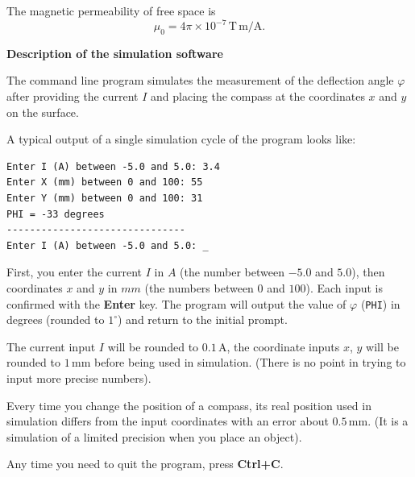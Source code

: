 The magnetic permeability of free space is
\[
\mu_0 = 4\pi \times 10^{-7}\,\mathrm{T\,m/A}.
\]

\textbf{Description of the simulation software}

The command line program simulates the measurement of the deflection angle
$\varphi$ after providing the current $I$ and placing the compass at the
coordinates $x$ and $y$ on the surface.

A typical output of a single simulation cycle of the program looks like:
\begin{verbatim}
Enter I (A) between -5.0 and 5.0: 3.4
Enter X (mm) between 0 and 100: 55
Enter Y (mm) between 0 and 100: 31
PHI = -33 degrees
-------------------------------
Enter I (A) between -5.0 and 5.0: _
\end{verbatim}

First, you enter the current $I$ in $A$ (the number between $-5.0$ and $5.0$),
then coordinates $x$ and $y$ in $mm$ (the numbers between $0$ and $100$). Each
input is confirmed with the \textbf{Enter} key. The program will output the
value of $\varphi$ (\texttt{PHI}) in degrees (rounded to $1^\circ$) and return
to the initial prompt.

The current input $I$ will be rounded to $0.1\,\mathrm{A}$, the coordinate
inputs $x$, $y$ will be rounded to $1\,\mathrm{mm}$ before being used in
simulation. (There is no point in trying to input more precise numbers).

Every time you change the position of a compass, its real position used in
simulation differs from the input coordinates with an error about
$0.5\,\mathrm{mm}$. (It is a simulation of a limited precision when you place
an object).

Any time you need to quit the program, press \textbf{Ctrl+C}.
